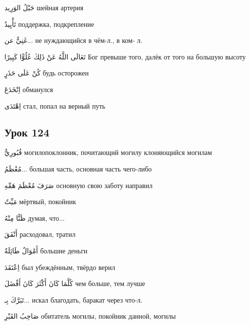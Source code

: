 \documentclass[a5paper]{article}
\newcommand\textstyleDropCaps[1]{#1}
\newcommand\textstyleCaptioncharacters[1]{#1}
\begin{document}
\textstyleCaptioncharacters{حَبْلُ الوَرِيد }\textstyleDropCaps{шейная ар­терия‎}

\textstyleCaptioncharacters{تَأْيِيدٌ }\textstyleDropCaps{поддержка, под­крепление‎}

\textstyleCaptioncharacters{غَنِيٌّ عن... }\textstyleDropCaps{не нуждаю­щийся в чём-л., в ком- л.‎}

\textstyleCaptioncharacters{تَعَالَى اللَّهُ عَنْ ذَلِكَ عُلُوًّا كَبِيرًا }\textstyleDropCaps{Бог превыше того, далёк от того на большую высоту‎}

\textstyleCaptioncharacters{كُنْ عَلَى حَذَرٍ }\textstyleDropCaps{будь осторожен‎}

\textstyleCaptioncharacters{اِنْخَدَعَ }\textstyleDropCaps{обманулся‎}

\textstyleCaptioncharacters{اِهْتَدَى }\textstyleDropCaps{стал, попал на вер­ный путь‎}

\subsection[Урок 124‎]{\textstyleDropCaps{Урок 124‎}}
\textstyleCaptioncharacters{قُبُورِيٌّ }\textstyleDropCaps{могилопоклон­ник, почитающий могилу клоняющийся могилам‎}

\textstyleCaptioncharacters{مُعْظَمُ... }\textstyleDropCaps{большая часть, основная часть чего-либо‎}

\textstyleCaptioncharacters{صَرَفَ مُعْظَمَ هَمِّهِ }\textstyleDropCaps{основную свою заботу направил‎}

\textstyleCaptioncharacters{مَيِّتٌ }\textstyleDropCaps{мёртвый, покойник ‎}

\textstyleCaptioncharacters{ظَنًّا مِنْهُ }\textstyleDropCaps{думая, что... ‎}

\textstyleCaptioncharacters{أَنْفَقَ }\textstyleDropCaps{расходовал, тратил ‎}

\textstyleCaptioncharacters{أَمْوَالٌ طَائِلَةٌ }\textstyleDropCaps{большие деньги‎}

\textstyleCaptioncharacters{اِعْتَقَدَ }\textstyleDropCaps{был убеждённым, твёрдо верил‎}

\textstyleCaptioncharacters{كُلَّمَا كَانَ أَكْثَرَ كَانَ أَفْضَلَ }\textstyleDropCaps{чем больше, тем лучше ‎}

\textstyleCaptioncharacters{تَبَرَّكَ بِـ... }\textstyleDropCaps{искал благо­дать, баракат через что-л.‎}

\textstyleCaptioncharacters{صَاحِبُ القَبْرِ }\textstyleDropCaps{обитатель могилы, покойник данной, могилы‎}
\end{document}
